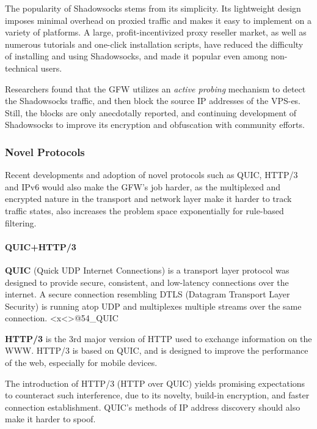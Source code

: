 \documentclass[sigconf]{acmart}
\begin{document}
The popularity of Shadowsocks stems from its simplicity. Its lightweight
design imposes minimal overhead on proxied traffic and makes it easy to
implement on a variety of platforms. A large, profit-incentivized proxy
reseller market, as well as numerous tutorials and one-click
installation scripts, have reduced the difficulty of installing and
using Shadowsocks, and made it popular even among non-technical users.

Researchers found that the GFW utilizes an \emph{active probing}
mechanism to detect the Shadowsocks traffic, and then block the source
IP addresses of the VPS-es. \cite{40_SSProbe} Still, the blocks are only
anecdotally reported, and continuing development of Shadowsocks to
improve its encryption and obfuscation with community efforts.

\hypertarget{novel-protocols}{%
\subsubsection{Novel Protocols}\label{novel-protocols}}

Recent developments and adoption of novel protocols such as QUIC, HTTP/3
and IPv6 would also make the GFW's job harder, as the multiplexed and
encrypted nature in the transport and network layer make it harder to
track traffic states, also increases the problem space exponentially for
rule-based filtering.

\hypertarget{quichttp3}{%
\paragraph{QUIC+HTTP/3}\label{quichttp3}}

\textbf{QUIC} (Quick UDP Internet Connections) is a transport layer
protocol was designed to provide secure, consistent, and low-latency
connections over the internet. A secure connection resembling DTLS
(Datagram Transport Layer Security) is running atop UDP and multiplexes
multiple streams over the same connection.
\textless x\textless\textgreater{}@54\_QUIC

\textbf{HTTP/3} is the 3rd major version of HTTP used to exchange
information on the WWW. HTTP/3 is based on QUIC, and is designed to
improve the performance of the web, especially for mobile devices.
\cite{55_HTTP3}

The introduction of HTTP/3 (HTTP over QUIC) yields promising
expectations to counteract such interference, due to its novelty,
build-in encryption, and faster connection establishment. QUIC's methods
of IP address discovery should also make it harder to spoof.
\end{document}
